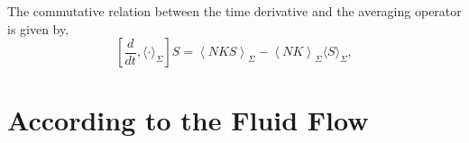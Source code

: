 The commutative relation between the time derivative and the averaging operator is given by,
\begin{equation}
	\left[\frac{d}{dt}, \langle\cdot \rangle_{\Sigma}\right] S=\left\langle NKS\right\rangle_{\Sigma}-\left\langle NK \right\rangle_{\Sigma}\langle S\rangle_{\Sigma},
	\label{eqn:comoving_commutation_rule_buchert}
\end{equation}


\section{According to the Fluid Flow}